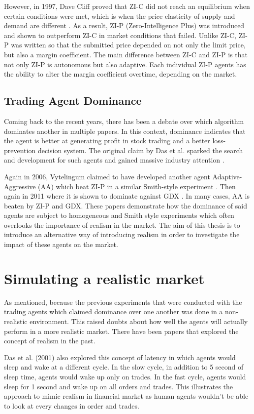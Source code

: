 However, in 1997, Dave Cliff proved that ZI-C did not reach an equilibrium when certain conditions were met, which is when the price elasticity of supply and demand are different \cite{zip1997}. As a result, ZI-P (Zero-Intelligence Plus) was introduced and shown to outperform ZI-C in market conditions that failed. Unlike ZI-C, ZI-P was written so that the submitted price depended on not only the limit price, but also a margin coefficient. The main difference between ZI-C and ZI-P is that not only ZI-P is autonomous but also adaptive. Each individual ZI-P agents has the ability to alter the margin coefficient overtime, depending on the market. 

\subsection{Trading Agent Dominance}
Coming back to the recent years, there has been a debate over which algorithm dominates another in multiple papers. In this context, dominance indicates that the agent is better at generating profit in stock trading and a better loss-prevention decision system. The original claim by Das et al. sparked the search and development for such agents and gained massive industry attention \cite{das2001}. 

Again in 2006, Vytelingum claimed to have developed another agent Adaptive-Aggressive (AA) which beat ZI-P in a similar Smith-style experiment \cite{AA2006}. Then again in 2011 where it is shown to dominate against GDX \cite{deluca2011}. In many cases, AA is beaten by ZI-P and GDX. These papers demonstrate how the dominance of said agents are subject to homogeneous and Smith style experiments which often overlooks the importance of realism in the market. The aim of this thesis is to introduce an alternative way of introducing realism in order to investigate the impact of these agents on the market. 

\section{Simulating a realistic market}
As mentioned, because the previous experiments that were conducted with the trading agents which claimed dominance over one another was done in a non-realistic environment. This raised doubts about how well the agents will actually perform in a more realistic market. There have been papers that explored the concept of realism in the past. 

Das et al. (2001) \cite{das2001} also explored this concept of latency in which agents would sleep and wake at a different cycle. In the slow cycle, in addition to 5 second of sleep time, agents would wake up only on trades. In the fast cycle, agents would sleep for 1 second and wake up on all orders and trades. This illustrates the approach to mimic realism in financial market as human agents wouldn’t be able to look at every changes in order and trades. 


